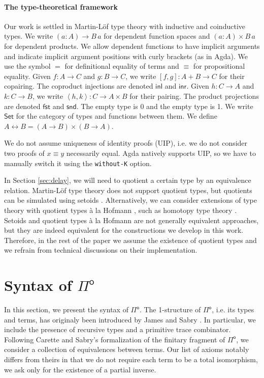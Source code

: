 \documentclass[runningheads,a4paper]{llncs}
\newcommand{\Pio}{\ensuremath{\mathsf{\Pi}^{\mathsf{o}}}}
\newcommand{\Set}{\mathsf{Set}}
\newcommand{\U}{\mathcal{U}}
\newcommand{\copair}[2]{[#1,#2]}
\newcommand{\pair}[2]{\left< #1,#2 \right>}
\newcommand{\inl}{\mathsf{inl}}
\newcommand{\inr}{\mathsf{inr}}
\newcommand{\fst}{\mathsf{fst}}
\newcommand{\snd}{\mathsf{snd}}
\begin{document}
\paragraph{The type-theoretical framework}

Our work is settled in Martin-L\"of type theory with inductive and
coinductive types. We write $(a : A) \to B \,a$ for dependent function
spaces and $(a : A) \times B \,a$ for dependent products. We allow
dependent functions to have implicit arguments and indicate implicit
argument positions with curly brackets (as in Agda). We use the
symbol $=$ for definitional equality of terms and $\equiv$ for
propositional equality. Given $f : A \to C$ and
$g : B \to C$, we write $\copair f g : A + B \to C$ for their
copairing. The coproduct injections are denoted $\inl$ and $\inr$.
Given $h : C \to A$ and $k : C \to B$, we write
$\pair h k : C \to A \times B$ for their pairing. The product
projections are denoted $\fst$ and $\snd$. The empty type is 0 and the
empty type is 1. We write $\Set$ for the category of
types and functions between them.
We define $A \leftrightarrow B = (A \to B) \times (B \to A)$.

We do not assume uniqueness of identity proofs
(UIP), i.e. we do not consider two proofs of $x \equiv y$ necessarily
equal. Agda natively supports UIP, so we have to manually switch it
using the \verb|without-K| option.

In Section \ref{sec:delay}, we will need to quotient a certain type by
an equivalence relation. Martin-L\"of type theory does not support
quotient types, but quotients can be simulated using setoids
\cite{BartheCP03}. Alternatively, we can consider extensions of type theory with
quotient types \`a la Hofmann \cite{Hofmann}, such as homotopy type
theory \cite{Hott}. Setoids and quotient types \`a la
Hofmann are not generally equivalent approaches, but they are indeed
equivalent for the constructions we develop in this work. Therefore,
in the rest of the paper we assume the existence of quotient types and
we refrain from technical discussions on their implementation.


\section{Syntax of \Pio}\label{sec:syntax}

In this section, we present the syntax of \Pio. The 1-structure of
\Pio, i.e. its types and terms, has originaly been introduced by James
and Sabry \cite{JamesS12}. In particular, we include the presence of
recursive types and a primitive trace combinator.  Following Carette
and Sabry's formalization of the finitary fragment of \Pio, we
consider a collection of equivalences between terms. Our list of
axioms notably differs from theirs in that we do not require each term to be
a total isomorphism, we ask only for the existence of a partial
inverse. 
\end{document}
